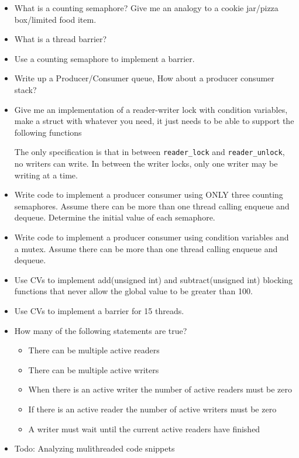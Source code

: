 \begin{itemize}
\item
  What is a counting semaphore? Give me an analogy to a cookie jar/pizza
  box/limited food item.
\item
  What is a thread barrier?
\item
  Use a counting semaphore to implement a barrier.
\item
  Write up a Producer/Consumer queue, How about a producer consumer
  stack?
\item
  Give me an implementation of a reader-writer lock with condition
  variables, make a struct with whatever you need, it just needs to be
  able to support the following functions

\begin{Shaded}
\begin{Highlighting}[]
 
 
 
 
\end{Highlighting}
\end{Shaded}

  The only specification is that in between \texttt{reader\_lock} and
  \texttt{reader\_unlock}, no writers can write. In between the writer
  locks, only one writer may be writing at a time.
\item
  Write code to implement a producer consumer using ONLY three counting
  semaphores. Assume there can be more than one thread calling enqueue
  and dequeue. Determine the initial value of each semaphore.
\item
  Write code to implement a producer consumer using condition variables
  and a mutex. Assume there can be more than one thread calling enqueue
  and dequeue.
\item
  Use CVs to implement add(unsigned int) and subtract(unsigned int)
  blocking functions that never allow the global value to be greater
  than 100.
\item
  Use CVs to implement a barrier for 15 threads.
\item
  How many of the following statements are true?

  \begin{itemize}
  \tightlist
  \item
    There can be multiple active readers
  \item
    There can be multiple active writers
  \item
    When there is an active writer the number of active readers must be
    zero
  \item
    If there is an active reader the number of active writers must be
    zero
  \item
    A writer must wait until the current active readers have finished
  \end{itemize}
\item
  Todo: Analyzing mulithreaded code snippets
\end{itemize}
